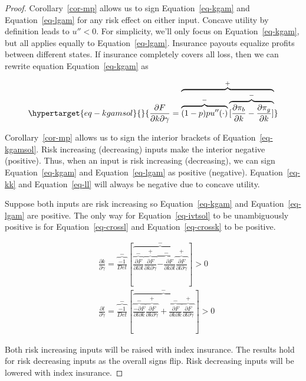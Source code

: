 \documentclass[
  letterpaper,
  DIV=11,
  numbers=noendperiod]{scrartcl}
\theoremstyle{plain}
\theoremstyle{plain}
\theoremstyle{remark}
\begin{document}
\begin{proof}

Corollary~\ref{cor-mp} allows us to sign Equation~\ref{eq-kgam} and
Equation~\ref{eq-lgam} for any risk effect on either input. Concave
utility by definition leads to \(u''<0\). For simplicity, we'll only
focus on Equation~\ref{eq-kgam}, but all applies equally to
Equation~\ref{eq-lgam}. Insurance payouts equalize profits between
different states. If insurance completely covers all loss, then we can
rewrite equation Equation~\ref{eq-kgam} as

\begin{equation}\protect\hypertarget{eq-kgamsol}{}{
\frac{\partial F}{\partial k \partial \gamma}=\overbrace{\overbrace{(1-p)pu''(\cdot)}^{-}\overbrace{[\frac{\partial \pi_b}{\partial k}-\frac{\partial \pi_g}{\partial k}]}^{-}}^{+}
}\label{eq-kgamsol}\end{equation}

Corollary~\ref{cor-mp} allows us to sign the interior brackets of
Equation~\ref{eq-kgamsol}. Risk increasing (decreasing) inputs make the
interior negative (positive). Thus, when an input is risk increasing
(decreasing), we can sign Equation~\ref{eq-kgam} and
Equation~\ref{eq-lgam} as positive (negative). Equation~\ref{eq-kk} and
Equation~\ref{eq-ll} will always be negative due to concave utility.

Suppose both inputs are risk increasing so Equation~\ref{eq-kgam} and
Equation~\ref{eq-lgam} are positive. The only way for
Equation~\ref{eq-ivtsol} to be unambiguously positive is for
Equation~\ref{eq-crossl} and Equation~\ref{eq-crossk} to be positive.

\[
\begin{aligned}
&\frac{\partial k}{\partial \gamma}=\overbrace{\frac{-1}{Det}}^{-}\left[\overbrace{\overbrace{\frac{\partial F}{\partial l \partial l}}^{-}\overbrace{\frac{\partial F}{\partial k \partial \gamma}}^{+}\overbrace{-\frac{\partial F}{\partial k \partial l}}^{-}\overbrace{\frac{\partial F}{\partial l \partial \gamma}}^{+}}^{-}\right] >0\\
&\frac{\partial l}{\partial \gamma}=\overbrace{\frac{-1}{Det}}^{-}\left[\overbrace{\overbrace{\frac{-\partial F}{\partial l \partial k}}^{-}\overbrace{\frac{\partial F}{\partial k \partial \gamma}}^{+}+\overbrace{\frac{\partial F}{\partial k \partial k}}^{-}\overbrace{\frac{\partial F}{\partial l \partial \gamma}}^{+}}^{-}\right]>0
\end{aligned}
\]

Both risk increasing inputs will be raised with index insurance. The
results hold for risk decreasing inputs as the overall signs flip. Risk
decreasing inputs will be lowered with index insurance.


\end{proof}
\end{document}
